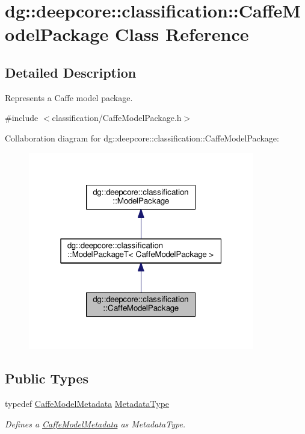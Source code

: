 \hypertarget{classdg_1_1deepcore_1_1classification_1_1_caffe_model_package}{}\section{dg\+:\+:deepcore\+:\+:classification\+:\+:Caffe\+Model\+Package Class Reference}
\label{classdg_1_1deepcore_1_1classification_1_1_caffe_model_package}


\subsection{Detailed Description}
Represents a Caffe model package. 

{\ttfamily \#include $<$classification/\+Caffe\+Model\+Package.\+h$>$}



Collaboration diagram for dg\+:\+:deepcore\+:\+:classification\+:\+:Caffe\+Model\+Package\+:
\nopagebreak
\begin{figure}[H]
\begin{center}
\leavevmode
\includegraphics[width=280pt]{classdg_1_1deepcore_1_1classification_1_1_caffe_model_package__coll__graph}
\end{center}
\end{figure}
\subsection*{Public Types}
\begin{DoxyCompactItemize}
\item 
typedef \hyperlink{structdg_1_1deepcore_1_1classification_1_1_caffe_model_metadata}{Caffe\+Model\+Metadata} \hyperlink{group___classification_module_gae0f23f2d134e0b3fc83b807077e32e8b}{Metadata\+Type}
\begin{DoxyCompactList}\small\item\em Defines a \hyperlink{structdg_1_1deepcore_1_1classification_1_1_caffe_model_metadata}{Caffe\+Model\+Metadata} as Metadata\+Type. \end{DoxyCompactList}\end{DoxyCompactItemize}
